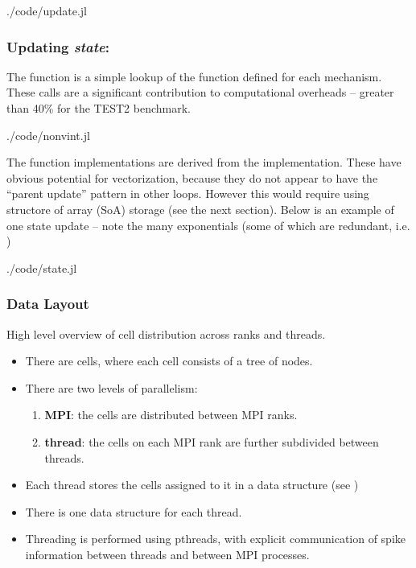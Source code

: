 
\begin{shaded}
 {./code/update.jl}
\end{shaded}
\subsubsection{Updating \emph{state}: }
The  function is a simple lookup of the  function defined for each mechanism. These calls are a significant contribution to computational overheads -- greater than 40\% for the TEST2 benchmark.

\begin{shaded}
 {./code/nonvint.jl}
\end{shaded}

The  function implementations are derived from the  implementation. These have obvious potential for vectorization, because they do not appear to have the ``parent update'' pattern in other loops. However this would require using structore of array (SoA) storage (see the next section). Below is an example of one state update -- note the many exponentials (some of which are redundant, i.e. )

\begin{shaded}
 {./code/state.jl}
\end{shaded}

\subsubsection{Data Layout}
High level overview of cell distribution across ranks and threads.
\begin{itemize}
\item
    There are cells, where each cell consists of a tree of nodes.
\item
    There are two levels of parallelism:
    \begin{enumerate}
    \item
        \textbf{MPI}: the cells are distributed between MPI ranks.
    \item
        \textbf{thread}: the cells on each MPI rank are further subdivided between threads.
    \end{enumerate}
\item
    Each thread stores the cells assigned to it in a  data structure (see )
\item
    There is one  data structure for each thread.
\item
    Threading is performed using pthreads, with explicit communication of spike information between threads and between MPI processes.
\end{itemize}


